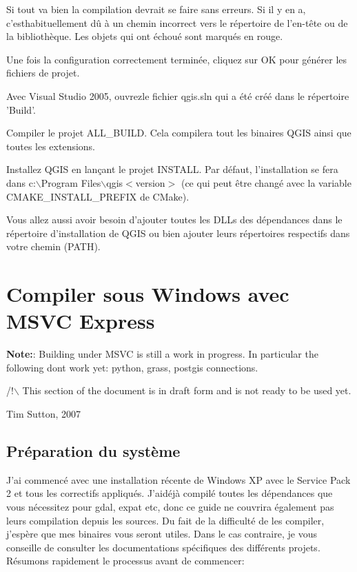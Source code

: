 Si tout va bien la compilation devrait se faire sans erreurs. Si il y en a, c'esthabituellement dû à un chemin incorrect vers le répertoire de l'en-tête ou de la bibliothèque. Les objets qui ont échoué sont marqués en rouge.

% 
% 
% 
% 

Une fois la configuration correctement terminée, cliquez sur OK pour générer les fichiers de projet.

Avec Visual Studio 2005, ouvrezle fichier qgis.sln qui a été créé dans le répertoire 'Build'.

Compiler le projet ALL\_BUILD. Cela compilera tout les binaires QGIS ainsi que toutes les extensions.

Installez QGIS en lançant le projet INSTALL. Par défaut, l'installation se fera dans c:$\backslash$Program Files$\backslash$qgis$<$version$>$ (ce qui peut être changé avec la variable CMAKE\_INSTALL\_PREFIX de CMake). 

Vous allez aussi avoir besoin d'ajouter toutes les DLLs des dépendances dans le répertoire d'installation de QGIS ou bien ajouter leurs répertoires respectifs dans votre chemin (PATH).

\section{Compiler sous Windows avec MSVC Express}
\textbf{Note:}: Building under MSVC is still a work in progress. In particular
the following dont work yet: python, grass, postgis connections.

/!$\backslash$ This section of the document is in draft form and is not ready to
be used yet.

Tim Sutton, 2007

\subsection{Préparation du système}
J'ai commencé avec une installation récente de Windows XP avec le Service Pack 2 et tous les correctifs appliqués. J'aidéjà compilé toutes les dépendances que vous nécessitez pour gdal, expat etc, donc ce guide ne couvrira également pas leurs compilation depuis les sources. Du fait de la difficulté de les compiler, j'espère que mes binaires vous seront utiles. Dans le cas contraire, je vous conseille de consulter les documentations spécifiques des différents projets. Résumons rapidement le processus avant de commencer:

